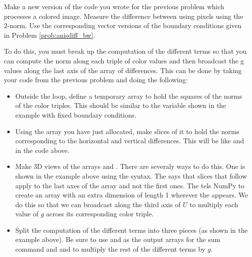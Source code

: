 \begin{problem}
Make a new version of the code you wrote for the previous problem which processes a colored image.
Measure the difference between using pixels using the $2$-norm.
Use the corresponding vector versions of the boundary conditions given in Problem \ref{prob:anisdiff_bw}.

To do this, you must break up the computation of the different terms so that you can compute the norm along each triple of color values and then broadcast the g values along the last axis of the array of differences.
This can be done by taking your code from the previous problem and doing the following:
\begin{itemize}

\item Outside the loop, define a temporary array to hold the squares of the norms of the color triples.
This should be similar to the variable  shown in the example with fixed boundary conditions.

\item Using the array you have just allocated, make slices of it to hold the norms corresponding to the horizontal and vertical differences.
This will be like  and  in the code above.

\item Make 3D views of the arrays  and .
There are severaly ways to do this.
One is shown in the example above using the \li{[...,None]} syntax.
The  says that slices that follow apply to the last axes of the array and not the first ones.
The  tels NumPy to create an array with an extra dimension of length 1 wherever the  appears.
We do this so that we can broadcast along the third axis of $U$ to multiply each value of $g$ across its corresponding color triple.

\item Split the computation of the different terms into three pieces (as shown in the example above).
Be sure to use  and  as the output arrays for the sum command and  and  to multiply the rest of the different terms by $g$.

\end{itemize}


\end{problem}
